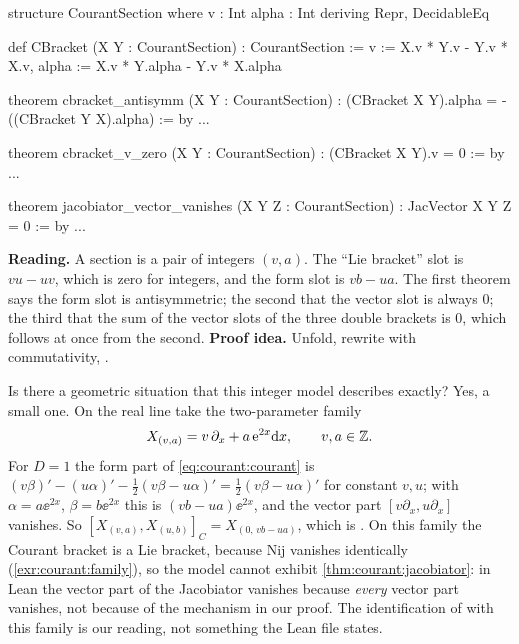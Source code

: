 \begin{leanbox}
\begin{leancode}
structure CourantSection where
  v : Int
  alpha : Int
deriving Repr, DecidableEq

def CBracket (X Y : CourantSection) : CourantSection :=
  { v := X.v * Y.v - Y.v * X.v,
    alpha := X.v * Y.alpha - Y.v * X.alpha }

theorem cbracket_antisymm (X Y : CourantSection) :
    (CBracket X Y).alpha = - ((CBracket Y X).alpha) := by ...

theorem cbracket_v_zero (X Y : CourantSection) :
    (CBracket X Y).v = 0 := by ...

theorem jacobiator_vector_vanishes (X Y Z : CourantSection) :
    JacVector X Y Z = 0 := by ...
\end{leancode}
\textbf{Reading.} A section is a pair of integers $(v,a)$. The ``Lie bracket'' slot is
$vu-uv$, which is zero for integers, and the form slot is $vb-ua$. The first theorem says the form
slot is antisymmetric; the second that the vector slot is always $0$; the third that the sum of
the vector slots of the three double brackets is $0$, which follows at once from the second.
\textbf{Proof idea.} Unfold, rewrite with commutativity, . \TA
\end{leanbox}

Is there a geometric situation that this integer model describes exactly? Yes, a small one.
On the real line take the two-parameter family
\[
X_{(v,a)}=v\,\partial_x+a\,\mathrm{e}^{2x}\mathrm{d} x,\qquad v,a\in\mathbb{Z} .
\]
For $D=1$ the form part of \eqref{eq:courant:courant} is
$(v\beta)'-(u\alpha)'-\tfrac12(v\beta-u\alpha)'=\tfrac12(v\beta-u\alpha)'$ for constant $v,u$; with
$\alpha=a\ee^{2x}$, $\beta=b\ee^{2x}$ this is $(vb-ua)\ee^{2x}$, and the vector part $[v\partial_x,
u\partial_x]$ vanishes. So
$[X_{(v,a)},X_{(u,b)}]_C=X_{(0,\,vb-ua)}$, which is . On this family the Courant
bracket is a Lie bracket, because $\mathrm{Nij}$ vanishes identically
(\cref{exr:courant:family}), so the model cannot exhibit \cref{thm:courant:jacobiator}: in Lean the
vector part of the Jacobiator vanishes because \emph{every} vector part vanishes, not because of
the mechanism in our proof. The identification of  with this family is our reading,
not something the Lean file states.

